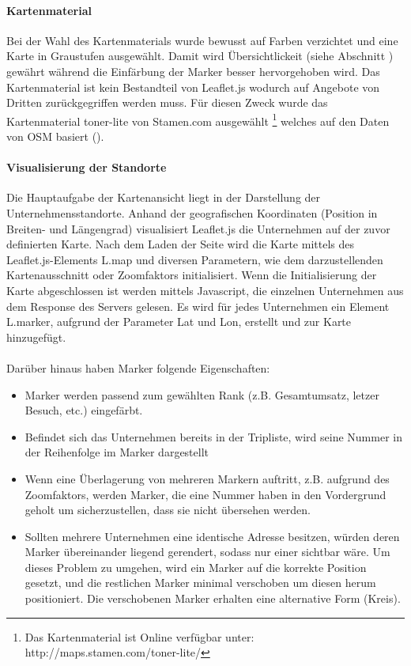 \documentclass[Bachelorarbeit.tex]{subfiles}
\begin{document}
\paragraph{Kartenmaterial}
Bei der Wahl des Kartenmaterials wurde bewusst auf Farben verzichtet und eine Karte in Graustufen ausgewählt. 
Damit wird Übersichtlickeit (siehe Abschnitt ) gewährt während die Einfärbung der Marker besser hervorgehoben wird.
Das Kartenmaterial ist kein Bestandteil von Leaflet.js wodurch auf Angebote von Dritten zurückgegriffen werden muss.
Für diesen Zweck wurde das Kartenmaterial toner-lite von Stamen.com ausgewählt
\footnote{Das Kartenmaterial ist Online verfügbar unter: http://maps.stamen.com/toner-lite/}  
welches auf den Daten von \ac{OSM} basiert (\cite[vgl.][]{Stamen}). 


\paragraph{Visualisierung der Standorte}
\label{ImplVisualStandorte}
Die Hauptaufgabe der Kartenansicht liegt in der Darstellung der Unternehmensstandorte.
Anhand der geografischen Koordinaten (Position in Breiten- und Längengrad) visualisiert Leaflet.js die Unternehmen auf der zuvor definierten Karte. 
Nach dem Laden der Seite wird die Karte mittels des Leaflet.js-Elements L.map und diversen Parametern, wie dem darzustellenden Kartenausschnitt oder Zoomfaktors initialisiert.
Wenn die Initialisierung der Karte abgeschlossen ist werden mittels Javascript, die einzelnen Unternehmen aus dem Response des Servers gelesen. 
Es wird für jedes Unternehmen ein Element L.marker, aufgrund der Parameter Lat und Lon, erstellt und zur Karte hinzugefügt. \\
\\
Darüber hinaus haben Marker folgende Eigenschaften:
\begin{itemize}
	\item Marker werden passend zum gewählten Rank (z.B. Gesamtumsatz, letzer Besuch, etc.) eingefärbt.
	\item Befindet sich das Unternehmen bereits in der Tripliste, wird seine Nummer in der Reihenfolge im Marker dargestellt
	\item Wenn eine Überlagerung von mehreren Markern auftritt, z.B. aufgrund des Zoomfaktors, werden Marker, die eine Nummer haben in den Vordergrund geholt um sicherzustellen, dass sie nicht übersehen werden.
	\item Sollten mehrere Unternehmen eine identische Adresse besitzen, würden deren Marker übereinander liegend gerendert, sodass nur einer sichtbar wäre. 
	Um dieses Problem zu umgehen, wird ein Marker auf die korrekte Position gesetzt, und die restlichen Marker minimal verschoben um diesen herum positioniert.
	Die verschobenen Marker erhalten eine alternative Form (Kreis).
\end{itemize}
\end{document}
